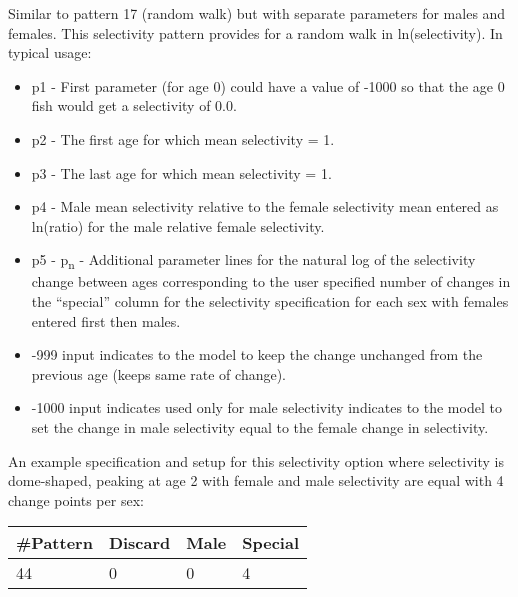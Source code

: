 \hypertarget{Pattern44}{}
Similar to pattern 17 (random walk) but with separate parameters for males and females. This selectivity pattern provides for a random walk in ln(selectivity). In typical usage:
	\begin{itemize}
		\item p1 - First parameter (for age 0) could have a value of -1000 so that the age 0 fish would get a selectivity of 0.0.
		\item p2 - The first age for which mean selectivity = 1.
		\item p3 - The last age for which mean selectivity = 1.
		\item p4 - Male mean selectivity relative to the female selectivity mean entered as ln(ratio) for the male relative female selectivity.
		\item p5 - p\textsubscript{n} - Additional parameter lines for the natural log of the selectivity change between ages corresponding to the user specified number of changes in the ``special'' column for the selectivity specification for each sex with females entered first then males.
		\item -999 input indicates to the model to keep the change unchanged from the previous age (keeps same rate of change).
		\item -1000 input indicates used only for male selectivity indicates to the model to set the change in male selectivity equal to the female change in selectivity.
	\end{itemize}
	
An example specification and setup for this selectivity option where selectivity is dome-shaped, peaking at age 2 with female and male selectivity are equal with 4 change points per sex:
	\begin{center}
		\begin{longtable}{p{1.5cm} p{1.5cm} p{1.5cm} p{1.5cm}}
			\hline
			\#Pattern & Discard & Male & Special \Tstrut\Bstrut\\
			\hline
			44 & 0 & 0 & 4 \Tstrut\Bstrut\\
			\hline
		\end{longtable}
	\end{center}

